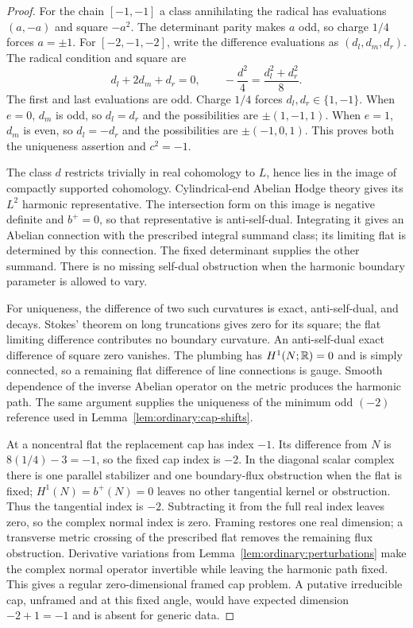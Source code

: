 \begin{proof}
For the chain $[-1,-1]$ a class annihilating the radical has
evaluations $(a,-a)$ and square $-a^2$.  The determinant
parity makes $a$ odd, so charge $1/4$ forces $a=\pm1$.
For $[-2,-1,-2]$, write the difference evaluations as
$(d_l,d_m,d_r)$.  The radical condition and square are
\begin{equation}\label{eq:ordinary:three-chain-charge}
 d_l+2d_m+d_r=0,
 \qquad -\frac{d^2}{4}=\frac{d_l^2+d_r^2}{8}.
\end{equation}
The first and last evaluations are odd.  Charge $1/4$
forces $d_l,d_r\in\{1,-1\}$.  When $e=0$, $d_m$ is
odd, so $d_l=d_r$ and the possibilities are
$\pm(1,-1,1)$.  When $e=1$, $d_m$ is even, so
$d_l=-d_r$ and the possibilities are $\pm(-1,0,1)$.
This proves both the uniqueness assertion and $c^2=-1$.

The class $d$ restricts trivially in real cohomology to
$L$, hence lies in the image of compactly supported
cohomology.  Cylindrical-end Abelian Hodge theory gives
its $L^2$ harmonic representative.  The intersection form
on this image is negative definite and $b^+=0$, so that
representative is anti-self-dual.  Integrating it gives
an Abelian connection with the prescribed integral
summand class; its limiting flat is determined by this
connection.  The fixed determinant supplies the other
summand.  There is no missing self-dual obstruction when
the harmonic boundary parameter is allowed to vary.

For uniqueness, the difference of two such curvatures
is exact, anti-self-dual, and decays.  Stokes' theorem on
long truncations gives zero for its square; the flat
limiting difference contributes no boundary curvature.
An anti-self-dual exact difference of square zero
vanishes.  The plumbing has $H^1(N;\mathbb R)=0$ and is simply
connected, so a remaining flat difference of line
connections is gauge.  Smooth dependence of the inverse
Abelian operator on the metric produces the harmonic
path.  The same argument supplies the uniqueness of the
minimum odd $(-2)$ reference used in
Lemma~\ref{lem:ordinary:cap-shifts}.

At a noncentral flat the replacement cap has index $-1$.
Its difference from $N$ is $8(1/4)-3=-1$, so the fixed
cap index is $-2$.  In the diagonal scalar complex there
is one parallel stabilizer and one boundary-flux
obstruction when the flat is fixed; $H^1(N)=b^+(N)=0$
leaves no other tangential kernel or obstruction.
Thus the tangential index is $-2$.  Subtracting it from
the full real index leaves zero, so the complex normal
index is zero.  Framing restores one real dimension;
a transverse metric crossing of the prescribed flat
removes the remaining flux obstruction.  Derivative
variations from Lemma~\ref{lem:ordinary:perturbations}
make the complex normal operator invertible while
leaving the harmonic path fixed.  This gives a regular
zero-dimensional framed cap problem.  A putative
irreducible cap, unframed and at this fixed angle, would
have expected dimension $-2+1=-1$ and is absent for
generic data.


\end{proof}
